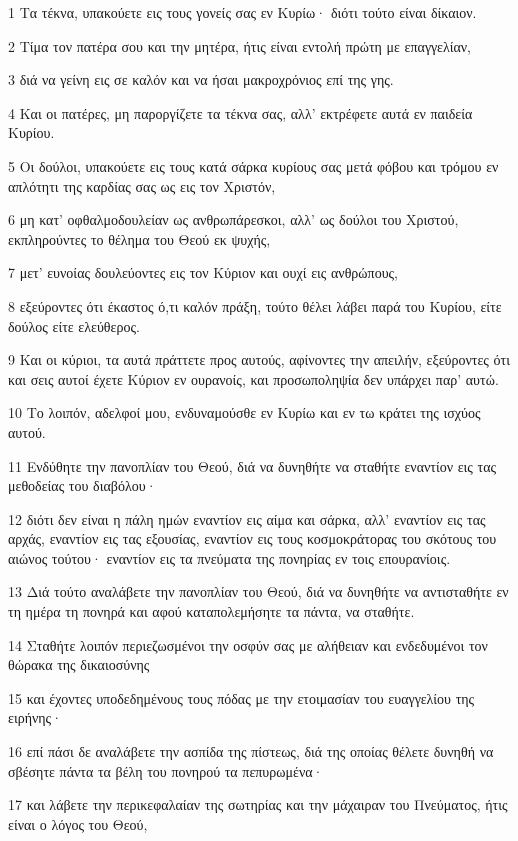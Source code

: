 \par 1 Τα τέκνα, υπακούετε εις τους γονείς σας εν Κυρίω· διότι τούτο είναι δίκαιον.
\par 2 Τίμα τον πατέρα σου και την μητέρα, ήτις είναι εντολή πρώτη με επαγγελίαν,
\par 3 διά να γείνη εις σε καλόν και να ήσαι μακροχρόνιος επί της γης.
\par 4 Και οι πατέρες, μη παροργίζετε τα τέκνα σας, αλλ' εκτρέφετε αυτά εν παιδεία Κυρίου.
\par 5 Οι δούλοι, υπακούετε εις τους κατά σάρκα κυρίους σας μετά φόβου και τρόμου εν απλότητι της καρδίας σας ως εις τον Χριστόν,
\par 6 μη κατ' οφθαλμοδουλείαν ως ανθρωπάρεσκοι, αλλ' ως δούλοι του Χριστού, εκπληρούντες το θέλημα του Θεού εκ ψυχής,
\par 7 μετ' ευνοίας δουλεύοντες εις τον Κύριον και ουχί εις ανθρώπους,
\par 8 εξεύροντες ότι έκαστος ό,τι καλόν πράξη, τούτο θέλει λάβει παρά του Κυρίου, είτε δούλος είτε ελεύθερος.
\par 9 Και οι κύριοι, τα αυτά πράττετε προς αυτούς, αφίνοντες την απειλήν, εξεύροντες ότι και σεις αυτοί έχετε Κύριον εν ουρανοίς, και προσωποληψία δεν υπάρχει παρ' αυτώ.
\par 10 Το λοιπόν, αδελφοί μου, ενδυναμούσθε εν Κυρίω και εν τω κράτει της ισχύος αυτού.
\par 11 Ενδύθητε την πανοπλίαν του Θεού, διά να δυνηθήτε να σταθήτε εναντίον εις τας μεθοδείας του διαβόλου·
\par 12 διότι δεν είναι η πάλη ημών εναντίον εις αίμα και σάρκα, αλλ' εναντίον εις τας αρχάς, εναντίον εις τας εξουσίας, εναντίον εις τους κοσμοκράτορας του σκότους του αιώνος τούτου· εναντίον εις τα πνεύματα της πονηρίας εν τοις επουρανίοις.
\par 13 Διά τούτο αναλάβετε την πανοπλίαν του Θεού, διά να δυνηθήτε να αντισταθήτε εν τη ημέρα τη πονηρά και αφού καταπολεμήσητε τα πάντα, να σταθήτε.
\par 14 Σταθήτε λοιπόν περιεζωσμένοι την οσφύν σας με αλήθειαν και ενδεδυμένοι τον θώρακα της δικαιοσύνης
\par 15 και έχοντες υποδεδημένους τους πόδας με την ετοιμασίαν του ευαγγελίου της ειρήνης·
\par 16 επί πάσι δε αναλάβετε την ασπίδα της πίστεως, διά της οποίας θέλετε δυνηθή να σβέσητε πάντα τα βέλη του πονηρού τα πεπυρωμένα·
\par 17 και λάβετε την περικεφαλαίαν της σωτηρίας και την μάχαιραν του Πνεύματος, ήτις είναι ο λόγος του Θεού,
